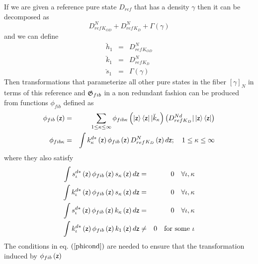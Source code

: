 If we are given a reference pure state $D_{ref}$ that has a density $\gamma $
then it can be decomposed as 
\begin{equation}
D_{ref}^{N}{}_{K_{OD}}+D_{ref}^{N}{}_{K_{D}}+\Gamma \left( \gamma \right)
\end{equation}%
and we can define 
\begin{eqnarray}
\breve{h}_{1} &=&D_{ref}^{N}{}_{K_{OD}}  \nonumber \\
\breve{k}_{1} &=&D_{ref}^{N}{}_{K_{D}}  \nonumber \\
\breve{s}_{1} &=&\Gamma \left( \gamma \right)
\end{eqnarray}%
Then transformations that parameterize all other pure states in the fiber $%
\left[ \gamma \right] _{N}$ in terms of this reference and ${\frak G}_{fib}$
in a non redundant fashion can be produced from functions $\phi _{fib}$
defined as 
\begin{eqnarray}
\phi _{fib}\left( {\sf z}\right) &=&\sum_{1\leq \kappa \leq \infty }\phi
_{fib\kappa }\left( \left| {\sf z}\right\rangle \left\langle {\sf z}\right| |%
\breve{k}_{\kappa }\right) \left( D_{refK_{D}}^{Nd}|\left| {\sf z}%
\right\rangle \left\langle {\sf z}\right| \right)  \nonumber \\
\phi _{fib\kappa } &=&\int k_{\kappa }^{d\ast }\left( {\sf z}\right) \phi
_{fib}\left( {\sf z}\right) D_{ref}^{N}{}_{K_{D}}\left( {\sf z}\right) d{\sf %
z};\quad 1\leq \kappa \leq \infty  \label{refkd}
\end{eqnarray}%
where they also satisfy 
\begin{eqnarray}
\int s_{\iota }^{d\ast }\left( {\sf z}\right) \phi _{fib}\left( {\sf z}%
\right) s_{\kappa }\left( {\sf z}\right) d{\sf z} &=&0\quad \forall \iota
,\kappa  \nonumber \\
\int k_{\iota }^{d\ast }\left( {\sf z}\right) \phi _{fib}\left( {\sf z}%
\right) s_{\kappa }\left( {\sf z}\right) d{\sf z} &=&0\quad \forall \iota
,\kappa  \nonumber \\
\int s_{\iota }^{d\ast }\left( {\sf z}\right) \phi _{fib}\left( {\sf z}%
\right) k_{\kappa }\left( {\sf z}\right) d{\sf z} &=&0\quad \forall \iota
,\kappa  \nonumber \\
\int k_{\iota }^{d\ast }\left( {\sf z}\right) \phi _{fib}\left( {\sf z}%
\right) k_{1}\left( {\sf z}\right) d{\sf z} &\neq &0\quad \text{for some }%
\iota  \label{phicond}
\end{eqnarray}%
The conditions in eq. $\left( \ref{phicond}\right) $ are needed to ensure
that the transformation induced by $\phi _{fib}\left( {\sf z}\right) $

